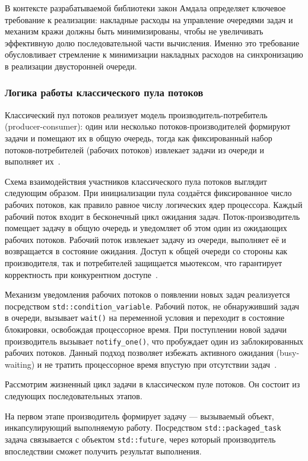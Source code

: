 В контексте разрабатываемой библиотеки закон Амдала определяет
ключевое требование к реализации: накладные расходы на управление
очередями задач и механизм кражи должны быть минимизированы,
чтобы не увеличивать эффективную долю последовательной части
вычисления. Именно это требование обусловливает стремление к минимизации 
накладных расходов на синхронизацию в реализации двусторонней очереди.

\subsubsection{Логика работы классического пула потоков}

Классический пул потоков реализует модель производитель-потребитель
(producer-consumer): один или несколько потоков-производителей
формируют задачи и помещают их в общую очередь, тогда как
фиксированный набор потоков-потребителей (рабочих потоков)
извлекает задачи из очереди и выполняет их~\cite{Williams2019}.

Схема взаимодействия участников классического пула потоков
выглядит следующим образом. При инициализации пула создаётся
фиксированное число рабочих потоков, как правило равное числу
логических ядер процессора. Каждый рабочий поток входит в
бесконечный цикл ожидания задач. Поток-производитель помещает
задачу в общую очередь и уведомляет об этом один из ожидающих
рабочих потоков. Рабочий поток извлекает задачу из очереди,
выполняет её и возвращается в состояние ожидания. Доступ
к общей очереди со стороны как производителя, так и потребителей
защищается мьютексом, что гарантирует корректность при
конкурентном доступе~\cite{Williams2019}.

Механизм уведомления рабочих потоков о появлении новых задач
реализуется посредством \texttt{std::condition\_variable}.
Рабочий поток, не обнаруживший задач в очереди, вызывает
\texttt{wait()} на переменной условия и переходит в состояние
блокировки, освобождая процессорное время. При поступлении новой
задачи производитель вызывает \texttt{notify\_one()}, что
пробуждает один из заблокированных рабочих потоков. Данный подход
позволяет избежать активного ожидания (busy-waiting) и не тратить
процессорное время впустую при отсутствии задач~\cite{Williams2019}.

Рассмотрим жизненный цикл задачи в классическом пуле потоков.
Он состоит из следующих последовательных этапов.

На первом этапе производитель формирует задачу --- вызываемый
объект, инкапсулирующий выполняемую работу. Посредством
\texttt{std::packaged\_task} задача связывается с объектом
\texttt{std::future}, через который производитель впоследствии
сможет получить результат выполнения.

